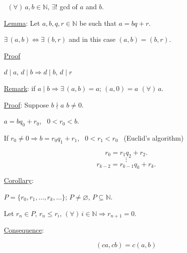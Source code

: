 \documentclass[12pt]{article}
\begin{document}
\noindent{} \ $(\forall)\,a,b\in\mathbb{N}$, $\exists!$ gcd of $a$ and $b$.

\bigskip
\noindent\underline{Lemma}: Let $a,b,q,r\in\mathbb{N}$ be such that $a=bq+r$.

\noindent $\exists\,(a,b) \Leftrightarrow \exists\,(b,r)$ and in this case $(a,b)=(b,r)$.

\bigskip
\noindent\underline{Proof}

\noindent $d\mid a$, $d\mid b \Rightarrow d\mid b$, $d\mid r$

\bigskip
\noindent\underline{Remark}: if $a\mid b \Rightarrow \exists\,(a,b)=a$; $(a,0)=a$ $(\forall)\,a$.

\bigskip
\noindent\underline{Proof}: Suppose $b\nmid a$ \quad $b\neq 0$.

\noindent $a=bq_0+r_0$, \ $0<r_0<b$.

\noindent If $r_0\neq 0 \Rightarrow b=r_0q_1+r_1$, \ $0<r_1<r_0$ \ (Euclid's algorithm)

\[
r_0=r_1q_2+r_2.
\]
\[
\vdots
\]
\[
r_{k-2}=r_{k-1}q_k+r_k.
\]

\bigskip
\noindent\underline{Corollary}:

\noindent $P=\{r_0,r_1,\ldots,r_k,\ldots\}$; $P\neq\varnothing$, $P\subseteq\mathbb{N}$.

\noindent Let $r_n\in P$, $r_n\leq r_i$, $(\forall)\,i\in\mathbb{N} \Rightarrow r_{n+1}=0$.

\bigskip
\noindent\underline{Consequence}:

\[
(ca,cb)=c(a,b)
\]
\end{document}
